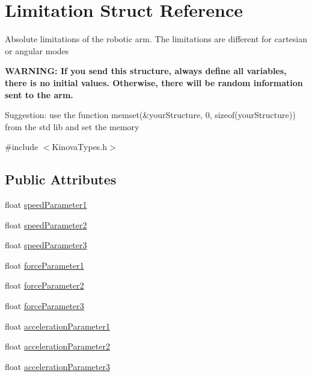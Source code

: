\hypertarget{struct_limitation}{\section{Limitation Struct Reference}
\label{struct_limitation}
}


\par
Absolute limitations of the robotic arm. The limitations are different for cartesian or angular modes \par
{\bfseries W\-A\-R\-N\-I\-N\-G\-: If you send this structure, always define all variables, there is no initial values. Otherwise, there will be random information sent to the arm.} \par
Suggestion\-: use the function memset(\&your\-Structure, 0, sizeof(your\-Structure)) from the std lib and set the memory  




{\ttfamily \#include $<$Kinova\-Types.\-h$>$}

\subsection*{Public Attributes}
\begin{DoxyCompactItemize}
\item 
float \hyperlink{struct_limitation_a3d36f2f90548acecb3e080d8c47d00f2}{speed\-Parameter1}
\item 
float \hyperlink{struct_limitation_aa17c9688bba54c9a8e2208d38266ae93}{speed\-Parameter2}
\item 
float \hyperlink{struct_limitation_a3d2e542a721c712b06b70f554d10d468}{speed\-Parameter3}
\item 
float \hyperlink{struct_limitation_abafcff837c521cea6d410245547b148e}{force\-Parameter1}
\item 
float \hyperlink{struct_limitation_a4a48f99b82a0078cfedb029c92355bef}{force\-Parameter2}
\item 
float \hyperlink{struct_limitation_a25a3f8ac4759c63b46d2201b651817e5}{force\-Parameter3}
\item 
float \hyperlink{struct_limitation_a695b233ff2bd5f53460fcadad86c0cfa}{acceleration\-Parameter1}
\item 
float \hyperlink{struct_limitation_a1bc77d927cb14ce2f963ccfa53fb0d99}{acceleration\-Parameter2}
\item 
float \hyperlink{struct_limitation_a23cd4303674bd42a0e583fced50a3511}{acceleration\-Parameter3}
\end{DoxyCompactItemize}


